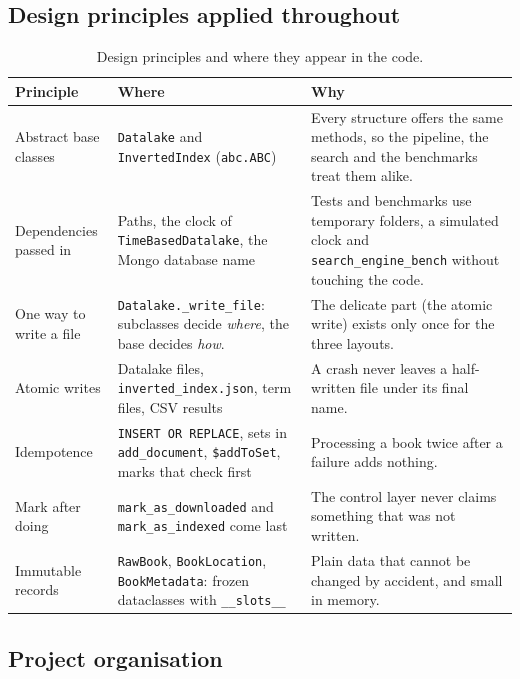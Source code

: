 \documentclass[11pt,a4paper]{article}
\newcommand{\code}[1]{\texttt{#1}}
\begin{document}
\subsection{Design principles applied throughout}
\begin{table}[H]
\centering\small
\begin{tabularx}{\linewidth}{@{}p{3.1cm} Y Y@{}}
\toprule
Principle & Where & Why \\
\midrule
Abstract base classes & \code{Datalake} and \code{InvertedIndex} (\code{abc.ABC}) & Every structure offers the same methods, so the pipeline, the search and the benchmarks treat them alike. \\
Dependencies passed in & Paths, the clock of \code{TimeBasedDatalake}, the Mongo database name & Tests and benchmarks use temporary folders, a simulated clock and \code{search\_engine\_bench} without touching the code. \\
One way to write a file & \code{Datalake.\_write\_file}: subclasses decide \emph{where}, the base decides \emph{how}. & The delicate part (the atomic write) exists only once for the three layouts. \\
Atomic writes & Datalake files, \code{inverted\_index.json}, term files, CSV results & A crash never leaves a half-written file under its final name. \\
Idempotence & \code{INSERT OR REPLACE}, sets in \code{add\_document}, \code{\$addToSet}, marks that check first & Processing a book twice after a failure adds nothing. \\
Mark after doing & \code{mark\_as\_downloaded} and \code{mark\_as\_indexed} come last & The control layer never claims something that was not written. \\
Immutable records & \code{RawBook}, \code{BookLocation}, \code{BookMetadata}: frozen dataclasses with \code{\_\_slots\_\_} & Plain data that cannot be changed by accident, and small in memory. \\
\bottomrule
\end{tabularx}
\caption{Design principles and where they appear in the code.}
\end{table}

\subsection{Project organisation}
\end{document}
